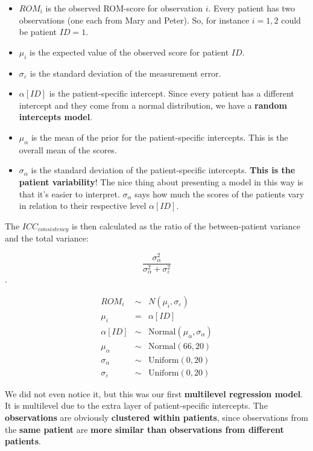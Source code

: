 \documentclass[
]{book}
\providecommand{\tightlist}{%
  \setlength{\itemsep}{0pt}\setlength{\parskip}{0pt}}
\begin{document}
\begin{itemize}
\tightlist
\item
  \(ROM_i\) is the observed ROM-score for observation \(i\).
  Every patient has two observations (one each from Mary and Peter).
  So, for instance \(i=1,2\) could be patient \(ID=1\).
\item
  \(\mu_i\) is the expected value of the observed score for patient \(ID\).
\item
  \(\sigma_{\varepsilon}\) is the standard deviation of the measurement error.
\item
  \(\alpha[ID]\) is the patient-specific intercept.
  Since every patient has a different intercept and they
  come from a normal distribution, we have a \textbf{random intercepts model}.
\item
  \(\mu_{\alpha}\) is the mean of the prior for the patient-specific intercepts.
  This is the overall mean of the scores.
\item
  \(\sigma_{\alpha}\) is the standard deviation of the patient-specific intercepts.
  \textbf{This is the patient variability}! The nice thing about presenting a model in this
  way is that it's easier to interpret. \(\sigma_{\alpha}\) says how much
  the scores of the patients vary in relation to their respective level \(\alpha[ID]\).
\end{itemize}

The \(ICC_{consistency}\) is then calculated as the ratio of the between-patient variance and
the total variance:

\[\frac{\sigma_{\alpha}^2}{\sigma_{\alpha}^2 + \sigma_{\varepsilon}^2}\].

\[
\begin{array}{rcl}
ROM_i &\sim& N(\mu_i, \sigma_{\varepsilon}) \\
\mu_i &=& \alpha[ID] \\
\alpha[ID] &\sim& \text{Normal}(\mu_{\alpha}, \sigma_{\alpha}) \\
\mu_{\alpha} &\sim& \text{Normal}(66, 20) \\
\sigma_{\alpha} &\sim& \text{Uniform}(0,20) \\
\sigma_{\varepsilon} &\sim& \text{Uniform}(0,20)
\end{array}
\]

We did not even notice it, but this was our first \textbf{multilevel regression model}.
It is multilevel due to the extra layer of patient-specific intercepts.
The \textbf{observations} are obviously \textbf{clustered within patients}, since observations
from the \textbf{same patient} are \textbf{more similar than observations from different patients}.
\end{document}
